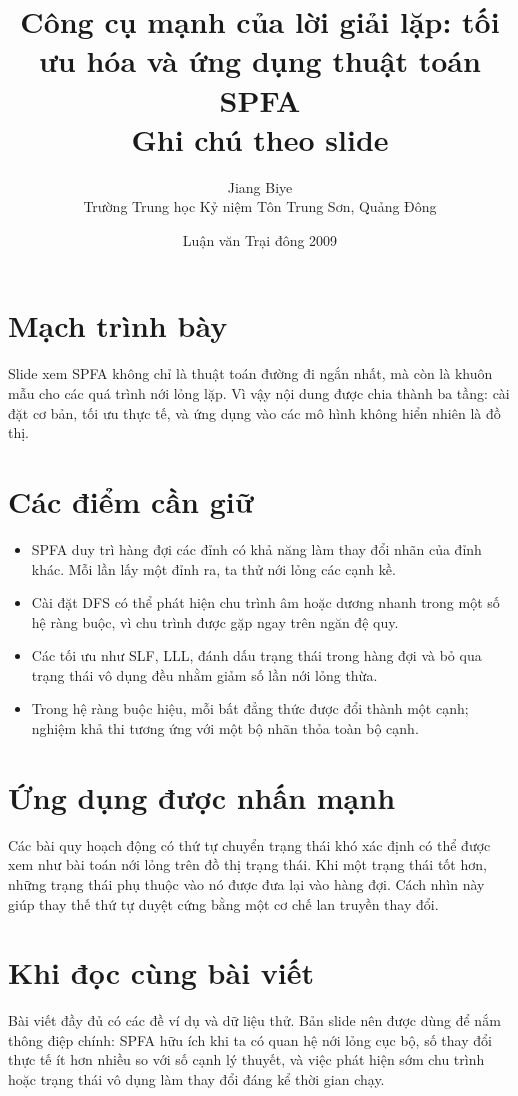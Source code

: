 \documentclass[11pt]{article}
\title{Công cụ mạnh của lời giải lặp: tối ưu hóa và ứng dụng thuật toán SPFA\\{\large Ghi chú theo slide}}
\author{Jiang Biye\\Trường Trung học Kỷ niệm Tôn Trung Sơn, Quảng Đông}
\date{Luận văn Trại đông 2009}
\begin{document}
\maketitle


\section{Mạch trình bày}

Slide xem SPFA không chỉ là thuật toán đường đi ngắn nhất, mà còn là khuôn
mẫu cho các quá trình nới lỏng lặp. Vì vậy nội dung được chia thành ba tầng:
cài đặt cơ bản, tối ưu thực tế, và ứng dụng vào các mô hình không hiển nhiên
là đồ thị.

\section{Các điểm cần giữ}

\begin{itemize}
  \item SPFA duy trì hàng đợi các đỉnh có khả năng làm thay đổi nhãn của đỉnh
  khác. Mỗi lần lấy một đỉnh ra, ta thử nới lỏng các cạnh kề.
  \item Cài đặt DFS có thể phát hiện chu trình âm hoặc dương nhanh trong một
  số hệ ràng buộc, vì chu trình được gặp ngay trên ngăn đệ quy.
  \item Các tối ưu như SLF, LLL, đánh dấu trạng thái trong hàng đợi và bỏ qua
  trạng thái vô dụng đều nhằm giảm số lần nới lỏng thừa.
  \item Trong hệ ràng buộc hiệu, mỗi bất đẳng thức được đổi thành một cạnh;
  nghiệm khả thi tương ứng với một bộ nhãn thỏa toàn bộ cạnh.
\end{itemize}

\section{Ứng dụng được nhấn mạnh}

Các bài quy hoạch động có thứ tự chuyển trạng thái khó xác định có thể được
xem như bài toán nới lỏng trên đồ thị trạng thái. Khi một trạng thái tốt hơn,
những trạng thái phụ thuộc vào nó được đưa lại vào hàng đợi. Cách nhìn này
giúp thay thế thứ tự duyệt cứng bằng một cơ chế lan truyền thay đổi.

\section{Khi đọc cùng bài viết}

Bài viết đầy đủ có các đề ví dụ và dữ liệu thử. Bản slide nên được dùng để
nắm thông điệp chính: SPFA hữu ích khi ta có quan hệ nới lỏng cục bộ, số thay
đổi thực tế ít hơn nhiều so với số cạnh lý thuyết, và việc phát hiện sớm
chu trình hoặc trạng thái vô dụng làm thay đổi đáng kể thời gian chạy.
\end{document}
